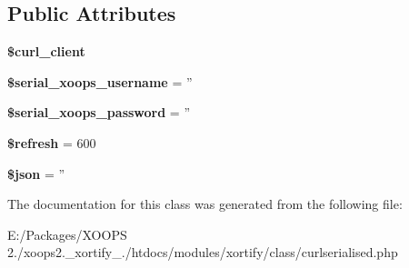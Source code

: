 \subsection*{Public Attributes}
\begin{DoxyCompactItemize}
\item 
\hypertarget{class_c_u_r_l_s_e_r_i_a_l_i_s_e_d_xortify_exchange_a22b06441424167f1c996c64823ea8e54}{{\bfseries \$curl\-\_\-client}}\label{class_c_u_r_l_s_e_r_i_a_l_i_s_e_d_xortify_exchange_a22b06441424167f1c996c64823ea8e54}

\item 
\hypertarget{class_c_u_r_l_s_e_r_i_a_l_i_s_e_d_xortify_exchange_afebe0bbb913c2abce366b908819ce94d}{{\bfseries \$serial\-\_\-xoops\-\_\-username} = ''}\label{class_c_u_r_l_s_e_r_i_a_l_i_s_e_d_xortify_exchange_afebe0bbb913c2abce366b908819ce94d}

\item 
\hypertarget{class_c_u_r_l_s_e_r_i_a_l_i_s_e_d_xortify_exchange_a6a248bdd97f181a11fd489dcf3a43f92}{{\bfseries \$serial\-\_\-xoops\-\_\-password} = ''}\label{class_c_u_r_l_s_e_r_i_a_l_i_s_e_d_xortify_exchange_a6a248bdd97f181a11fd489dcf3a43f92}

\item 
\hypertarget{class_c_u_r_l_s_e_r_i_a_l_i_s_e_d_xortify_exchange_abc2f27ee3187c6c9879a5ce9da70e5d5}{{\bfseries \$refresh} = 600}\label{class_c_u_r_l_s_e_r_i_a_l_i_s_e_d_xortify_exchange_abc2f27ee3187c6c9879a5ce9da70e5d5}

\item 
\hypertarget{class_c_u_r_l_s_e_r_i_a_l_i_s_e_d_xortify_exchange_a1fa42144727c9a5dbe3e5227a14dc984}{{\bfseries \$json} = ''}\label{class_c_u_r_l_s_e_r_i_a_l_i_s_e_d_xortify_exchange_a1fa42144727c9a5dbe3e5227a14dc984}

\end{DoxyCompactItemize}


The documentation for this class was generated from the following file\-:\begin{DoxyCompactItemize}
\item 
E\-:/\-Packages/\-X\-O\-O\-P\-S 2./xoops2.\-\_\-xortify\-\_./htdocs/modules/xortify/class/curlserialised.\-php\end{DoxyCompactItemize}
